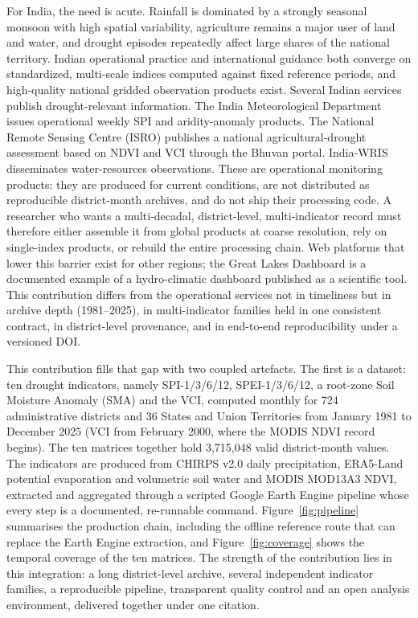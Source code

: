 \documentclass[10pt,a4paper]{article}
\begin{document}
For India, the need is acute. Rainfall is dominated by a strongly seasonal monsoon with high spatial variability, agriculture remains a major user of land and water, and drought episodes repeatedly affect large shares of the national territory\citep{GadgilGadgil2006}. Indian operational practice and international guidance both converge on standardized, multi-scale indices computed against fixed reference periods\citep{WMOLincoln2009}, and high-quality national gridded observation products exist\citep{Pai2014,Srivastava2009}. Several Indian services publish drought-relevant information. The India Meteorological Department issues operational weekly SPI and aridity-anomaly products. The National Remote Sensing Centre (ISRO) publishes a national agricultural-drought assessment based on NDVI and VCI through the Bhuvan portal. India-WRIS disseminates water-resources observations. These are operational monitoring products: they are produced for current conditions, are not distributed as reproducible district-month archives, and do not ship their processing code. A researcher who wants a multi-decadal, district-level, multi-indicator record must therefore either assemble it from global products at coarse resolution, rely on single-index products, or rebuild the entire processing chain. Web platforms that lower this barrier exist for other regions; the Great Lakes Dashboard is a documented example of a hydro-climatic dashboard published as a scientific tool\citep{Smith2016}. This contribution differs from the operational services not in timeliness but in archive depth (1981--2025), in multi-indicator families held in one consistent contract, in district-level provenance, and in end-to-end reproducibility under a versioned DOI.

This contribution fills that gap with two coupled artefacts. The first is a dataset: ten drought indicators, namely SPI-1/3/6/12, SPEI-1/3/6/12, a root-zone Soil Moisture Anomaly (SMA) and the VCI, computed monthly for 724 administrative districts and 36 States and Union Territories from January 1981 to December 2025 (VCI from February 2000, where the MODIS NDVI record begins). The ten matrices together hold 3{,}715{,}048 valid district-month values. The indicators are produced from CHIRPS v2.0 daily precipitation\citep{Funk2015}, ERA5-Land potential evaporation and volumetric soil water\citep{MunozSabater2021} and MODIS MOD13A3 NDVI\citep{Didan2015}, extracted and aggregated through a scripted Google Earth Engine pipeline\citep{Gorelick2017} whose every step is a documented, re-runnable command. Figure~\ref{fig:pipeline} summarises the production chain, including the offline reference route that can replace the Earth Engine extraction, and Figure~\ref{fig:coverage} shows the temporal coverage of the ten matrices. The strength of the contribution lies in this integration: a long district-level archive, several independent indicator families, a reproducible pipeline, transparent quality control and an open analysis environment, delivered together under one citation.
\end{document}
